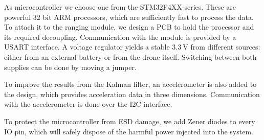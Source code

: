 \documentclass[a4paper]{article}        %
\begin{document}
  As microcontroller we choose one from the STM32F4XX-series. These are powerful 32 bit ARM processors, which are sufficiently fast to process the data.
  To attach it to the ranging module, we design a PCB to hold the processor and its required decoupling. Communication with the module is provided by a USART interface.
  A voltage regulator yields a stable $\SI{3.3}{\volt}$ from different sources: either from an external battery or from the drone itself. Switching between both supplies can be done by moving a jumper.

  To improve the results from the Kalman filter, an accelerometer is also added to the design, which provides acceleration data in three dimensions. Communication with the accelerometer is done over the I2C interface.

  To protect the microcontroller from ESD damage, we add Zener diodes to every IO pin, which will safely dispose of the harmful power injected into the system.

  
\end{document}

